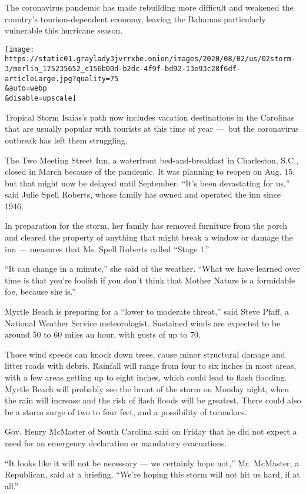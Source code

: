 The coronavirus pandemic has made rebuilding more difficult and weakened
the country's tourism-dependent economy, leaving the Bahamas
particularly vulnerable this hurricane season.

\texttt{[image: https://static01.graylady3jvrrxbe.onion/images/2020/08/02/us/02storm-3/merlin\_175235652\_c156b00d-b2dc-4f9f-bd92-13e93c28f6df-articleLarge.jpg?quality=75\\\&auto=webp\\\&disable=upscale]}

Tropical Storm Isaias's path now includes vacation destinations in the
Carolinas that are usually popular with tourists at this time of year
---~but the coronavirus outbreak has left them struggling.

The Two Meeting Street Inn, a waterfront bed-and-breakfast in
Charleston, S.C., closed in March because of the pandemic. It was
planning to reopen on Aug. 15, but that might now be delayed until
September. ``It's been devastating for us,'' said Julie Spell Roberts,
whose family has owned and operated the inn since 1946.

In preparation for the storm, her family has removed furniture from the
porch and cleared the property of anything that might break a window or
damage the inn --- measures that Ms. Spell Roberts called ``Stage 1.''

``It can change in a minute,'' she said of the weather. ``What we have
learned over time is that you're foolish if you don't think that Mother
Nature is a formidable foe, because she is.''

Myrtle Beach is preparing for a ``lower to moderate threat,'' said Steve
Pfaff, a National Weather Service meteorologist. Sustained winds are
expected to be around 50 to 60 miles an hour, with gusts of up to 70.

Those wind speeds can knock down trees, cause minor structural damage
and litter roads with debris. Rainfall will range from four to six
inches in most areas, with a few areas getting up to eight inches, which
could lead to flash flooding. Myrtle Beach will probably see the brunt
of the storm on Monday night, when the rain will increase and the risk
of flash floods will be greatest. There could also be a storm surge of
two to four feet, and a possibility of tornadoes.

Gov. Henry McMaster of South Carolina said on Friday that he did not
expect a need for an emergency declaration or mandatory evacuations.

``It looks like it will not be necessary --- we certainly hope not,''
Mr. McMaster, a Republican, said at a briefing. ``We're hoping this
storm will not hit us hard, if at all.''

